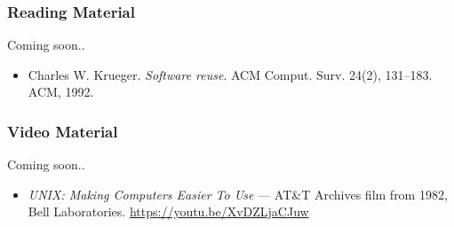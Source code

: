 \begin{frame}

\frametitle{Reading Material}

\begin{center}

Coming soon..

\end{center}

\footnotesize

\begin{itemize}

\item Charles W. Krueger. \emph{Software reuse}. ACM Comput. Surv. 24(2),
131--183. ACM, 1992.

\end{itemize}

\end{frame}


\begin{frame}

\frametitle{Video Material}

\begin{center}

Coming soon..

\end{center}

\footnotesize

\begin{itemize}

\item \emph{UNIX: Making Computers Easier To Use} --- AT\&T Archives film from
1982, Bell Laboratories. \url{https://youtu.be/XvDZLjaCJuw}

\end{itemize}

\end{frame}

